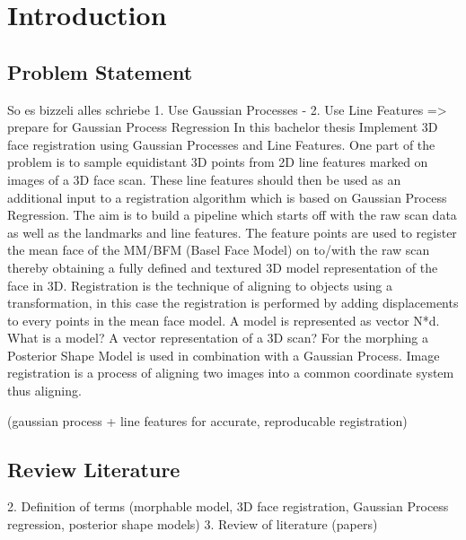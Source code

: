 \chapter{Introduction}

\section{Problem Statement}
So es bizzeli alles schriebe
1. Use Gaussian Processes - 2. Use Line Features => prepare for Gaussian Process Regression
In this bachelor thesis 
Implement 3D face registration using Gaussian Processes and Line Features. One part of the problem is to sample equidistant 3D points from 2D line features marked on images of a 3D face scan. These line features should then be used as an additional input to a registration algorithm which is based on Gaussian Process Regression. The aim is to build a pipeline which starts off with the raw scan data as well as the landmarks and line features. The feature points are used to register the mean face of the MM/BFM (Basel Face Model) on to/with the raw scan thereby obtaining a fully defined and textured 3D model representation of the face in 3D. Registration is the technique of aligning to objects using a transformation, in this case the registration is performed by adding displacements to every points in the mean face model.
A model is represented as vector N*d. What is a model? A vector representation of a 3D scan?
For the morphing a Posterior Shape Model is used in combination with a Gaussian Process.
Image registration is a process of aligning two images into a common coordinate system 
thus aligning.

(gaussian process + line features for accurate, reproducable registration)

\section{Review Literature}
	2. Definition of terms (morphable model, 3D face registration, Gaussian Process regression, posterior shape models)
	3. Review of literature (papers)


